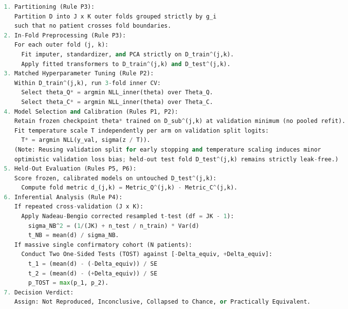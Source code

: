 \documentclass[10pt,a4paper,twoside]{article}
\begin{document}
\begin{multicols}{2}
\begin{lstlisting}[language=Python, caption={Algorithm 1: Symmetric Evaluation Protocol for Clinical Prediction Models.}]
1. Partitioning (Rule P3):
   Partition D into J x K outer folds grouped strictly by g_i
   such that no patient crosses fold boundaries.
2. In-Fold Preprocessing (Rule P3):
   For each outer fold (j, k):
     Fit imputer, standardizer, and PCA strictly on D_train^(j,k).
     Apply fitted transformers to D_train^(j,k) and D_test^(j,k).
3. Matched Hyperparameter Tuning (Rule P2):
   Within D_train^(j,k), run 3-fold inner CV:
     Select theta_Q* = argmin NLL_inner(theta) over Theta_Q.
     Select theta_C* = argmin NLL_inner(theta) over Theta_C.
4. Model Selection and Calibration (Rules P1, P2):
   Retain frozen checkpoint theta* trained on D_sub^(j,k) at validation minimum (no pooled refit).
   Fit temperature scale T independently per arm on validation split logits:
     T* = argmin NLL(y_val, sigma(z / T)).
   (Note: Reusing validation split for early stopping and temperature scaling induces minor
   optimistic validation loss bias; held-out test fold D_test^(j,k) remains strictly leak-free.)
5. Held-Out Evaluation (Rules P5, P6):
   Score frozen, calibrated models on untouched D_test^(j,k):
     Compute fold metric d_(j,k) = Metric_Q^(j,k) - Metric_C^(j,k).
6. Inferential Analysis (Rule P4):
   If repeated cross-validation (J x K):
     Apply Nadeau-Bengio corrected resampled t-test (df = JK - 1):
       sigma_NB^2 = (1/(JK) + n_test / n_train) * Var(d)
       t_NB = mean(d) / sigma_NB.
   If massive single confirmatory cohort (N patients):
     Conduct Two One-Sided Tests (TOST) against [-Delta_equiv, +Delta_equiv]:
       t_1 = (mean(d) - (-Delta_equiv)) / SE
       t_2 = (mean(d) - (+Delta_equiv)) / SE
       p_TOST = max(p_1, p_2).
7. Decision Verdict:
   Assign: Not Reproduced, Inconclusive, Collapsed to Chance, or Practically Equivalent.
\end{lstlisting}


\end{multicols}
\end{document}
